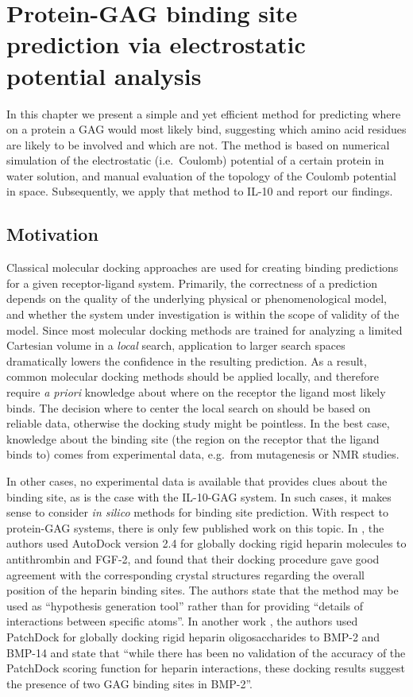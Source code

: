 \chapter{Protein-GAG binding site prediction via electrostatic potential analysis}

In this chapter we present a simple and yet efficient method for predicting
where on a protein a GAG would most likely bind, suggesting which amino acid
residues are likely to be involved and which are not. The method is based on
numerical simulation of the electrostatic (i.e.\ Coulomb) potential of a certain
protein in water solution, and manual evaluation of the topology of the Coulomb
potential in space. Subsequently, we apply that method to IL-10 and report our
findings.

\section{Motivation}

Classical molecular docking approaches are used for creating binding predictions
for a given receptor-ligand system. Primarily, the correctness of a prediction
depends on the quality of the underlying physical or phenomenological model, and
whether the system under investigation is within the scope of validity of the
model. Since most molecular docking methods are trained for analyzing a limited
Cartesian volume in a \textit{local} search, application to larger search spaces
dramatically lowers the confidence in the resulting prediction. As a result,
common molecular docking methods should be applied locally, and therefore
require \textit{a priori} knowledge about where on the receptor the ligand most
likely binds. The decision where to center the local search on should be based
on reliable data, otherwise the docking study might be pointless. In the best
case, knowledge about the binding site (the region on the receptor that the
ligand binds to) comes from experimental data, e.g.\ from mutagenesis or NMR
studies.

In other cases, no experimental data is available that provides clues about the
binding site, as is the case with the IL-10-GAG system. In such cases, it makes
sense to consider \textit{in silico} methods for binding site prediction.  With
respect to protein-GAG systems, there is only few published work on this topic.
In \cite{hp_binding_sites_mulloy_2006}, the authors used AutoDock version 2.4
\cite{autodock24} for globally docking rigid heparin molecules to antithrombin
and FGF-2, and found that their docking procedure gave good agreement with the
corresponding crystal structures regarding the overall position of the heparin
binding sites. The authors state that the method may be used as
\enquote{hypothesis generation tool} rather than for providing \enquote{details
of interactions between specific atoms}. In another work
\cite{gandhi_bmp_heparin_binding_sites_2012}, the authors used PatchDock
\cite{patchdock_2002} for globally docking rigid heparin oligosaccharides to
BMP-2 and BMP-14 and state that \enquote{while there has been no validation
of the accuracy of the PatchDock scoring function for heparin interactions,
these docking results suggest the presence of two GAG binding sites in BMP-2}.


